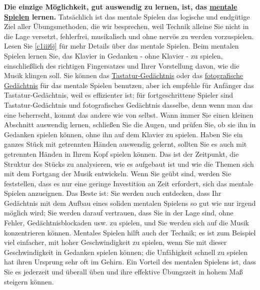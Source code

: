 \textbf{Die einzige Möglichkeit, gut auswendig zu lernen, ist, das \hyperref[c1iii6tastatur]{mentale Spielen} lernen.}
Tatsächlich ist das mentale Spielen das logische und endgütige Ziel aller Übungsmethoden, die wir besprechen, weil Technik alleine Sie nicht in die Lage versetzt, fehlerfrei, musikalisch und ohne nervös zu werden vorzuspielen.
Lesen Sie \hyperref[c1iii6j]{\ref*{c1iii6j}} für mehr Details über das mentale Spielen.
Beim mentalen Spielen lernen Sie, das Klavier in Gedanken - ohne Klavier - zu spielen, einschließlich des richtigen Fingersatzes und Ihrer Vorstellung davon, wie die Musik klingen soll.
Sie können das \hyperref[c1iii6tastatur]{Tastatur-Gedächtnis} oder das \hyperref[c1iii6foto]{fotografische Gedächtnis} für das mentale Spielen benutzen, aber ich empfehle für Anfänger das Tastatur-Gedächtnis, weil es effizienter ist;
für fortgeschrittene Spieler sind Tastatur-Gedächtnis und  fotografisches Gedächtnis dasselbe, denn wenn man das eine beherrscht, kommt das andere wie von selbst.
Wann immer Sie einen kleinen Abschnitt auswendig lernen, schließen Sie die Augen, und prüfen Sie, ob sie ihn in Gedanken spielen können, ohne ihn auf dem Klavier zu spielen.
Haben Sie ein ganzes Stück mit getrennten Händen auswendig gelernt, sollten Sie es auch mit getrennten Händen in Ihrem Kopf spielen können.
Das ist der Zeitpunkt, die Struktur des Stücks zu analysieren, wie es aufgebaut ist und wie die Themen sich mit dem Fortgang der Musik entwickeln.
Wenn Sie geübt sind, werden Sie feststellen, dass es nur eine geringe Investition an Zeit erfordert, sich das mentale Spielen anzueignen.
Das Beste ist: Sie werden auch entdecken, dass Ihr Gedächtnis mit dem Aufbau eines soliden mentalen Spielens so gut wie nur irgend möglich wird; Sie werden darauf vertrauen, dass Sie in der Lage sind, ohne Fehler, Gedächtnisblockaden usw. zu spielen, und Sie werden sich auf die Musik konzentrieren können.
Mentales Spielen hilft auch der Technik; es ist zum Beispiel viel einfacher, mit hoher Geschwindigkeit zu spielen, wenn Sie mit dieser Geschwindigkeit in Gedanken spielen können; die Unfähigkeit schnell zu spielen hat ihren Ursprung sehr oft im Gehirn.
Ein Vorteil des mentalen Spielens ist, dass Sie es jederzeit und überall üben und ihre effektive Übungszeit in hohem Maß steigern können.

